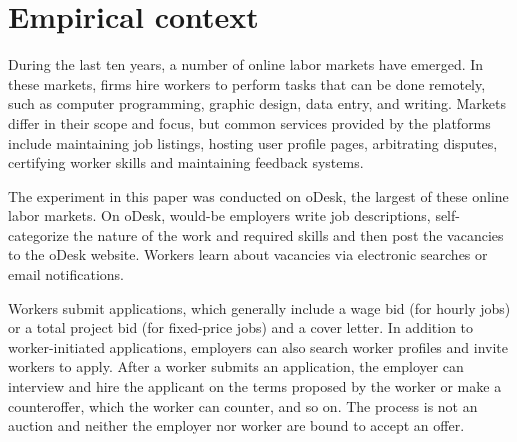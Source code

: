 \documentclass[prodmode,acmec]{ec-acmsmall}
\begin{document}














\section{Empirical context} 
\label{sec:empirical_context}

During the last ten years, a number of online labor markets have emerged. 
In these markets, firms hire workers to perform tasks that can be done remotely, such as computer programming, graphic design, data entry, and writing. 
Markets differ in their scope and focus, but common services provided by the platforms include maintaining job listings, hosting user profile pages, arbitrating disputes, certifying worker skills and maintaining feedback systems. 

The experiment in this paper was conducted on oDesk, the largest of these online labor markets.  
On oDesk, would-be employers write job descriptions, self-categorize the nature of the work and required skills and then post the vacancies to the oDesk website. 
Workers learn about vacancies via electronic searches or email notifications. 
 
Workers submit applications, which generally include a wage bid (for hourly jobs) or a total project bid (for fixed-price jobs) and a cover letter. 
In addition to worker-initiated applications, employers can also search worker profiles and invite workers to apply. 
After a worker submits an application, the employer can interview and hire the applicant on the terms proposed by the worker or make a counteroffer, which the worker can counter, and so on.
The process is not an auction and neither the employer nor worker are bound to accept an offer. 
\end{document}
